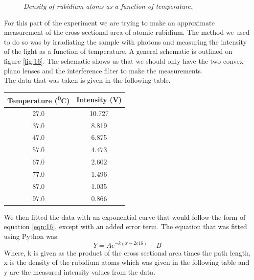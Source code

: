 \documentclass[twocolumn]{article}
\begin{document}
\begin{figure}
\begin{minipage}[t]{0.45\textwidth}
\caption{\textit{Density of rubidium atoms as a function of temperature.}}
\label{fig:18}
\end{minipage}
\end{figure}
For this part of the experiment we are trying to make an approximate 
measurement of the cross sectional area of atomic rubidium. The method we used 
to do so was by irradiating the sample with photons and measuring the 
intensity of the light as a function of temperature. A general schematic is 
outlined on figure \ref{fig:16}. The schematic shows us that we should only 
have the two convex-plano lenses and the interference filter to make the 
measurements.
\\
The data that was taken is given in the following table.
\begin{minipage}{\linewidth}
\center
\begin{tabular}{|c|c|}
\hline
Temperature (\textsuperscript{0}C) & Intensity (V) \\ \hline
27.0 & 10.727 \\ \hline
37.0 & 8.819 \\ \hline
47.0 & 6.875 \\ \hline
57.0 & 4.473 \\ \hline
67.0 & 2.602 \\ \hline
77.0 & 1.496 \\ \hline
87.0 & 1.035 \\ \hline
97.0 & 0.866 \\ \hline
\end{tabular}
\label{tbl:4}
\end{minipage}
We then fitted the data with an exponential curve that would follow the 
form of equation \ref{eqn:16}, except with an added error term. The equation 
that was fitted using Python was.
\begin{equation}
Y = Ae^{-k(x-2e16)}+B
\label{eqn:20}
\end{equation}
Where, k is given as the product of the cross sectional area times the path 
length, x is the density of the rubidium atoms which was given in the 
following table and y are the measured intensity values from the data.
\end{document}
